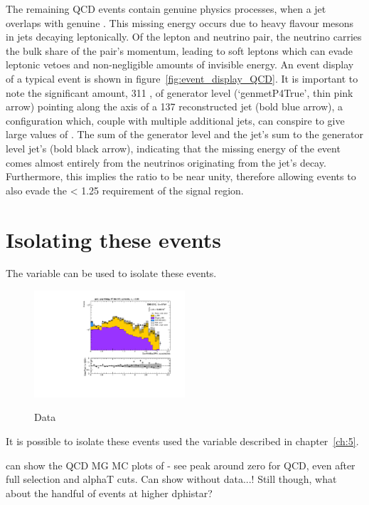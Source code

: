 The remaining QCD events contain genuine physics processes, when a jet overlaps
with genuine \met. This missing energy occurs due to heavy flavour mesons in
jets decaying leptonically. Of the lepton and neutrino pair, the neutrino
carries the bulk share of the pair's momentum, leading to soft leptons which
can evade leptonic vetoes and non-negligible amounts of invisible energy. An
event display of a typical event is shown in figure~\ref{fig:event_display_QCD}.
It is important to note the significant amount, 311 \gev, of generator level
\met (`genmetP4True', thin pink arrow) pointing along the axis of a 137
\gev \Pt reconstructed jet (bold blue arrow), a configuration which,
couple with multiple additional jets, can conspire to give
large values of \alphat. The sum of the generator level \met \Pt and
the jet's \Pt sum to the generator level jet's \Pt (bold black arrow),
indicating that the missing energy of the event comes almost entirely from the
neutrinos originating from the jet's decay. Furthermore, this implies the ratio
\mhtmet to be near unity, therefore allowing events to also evade the \mhtmet <
1.25 requirement of the signal region.

\section{Isolating these events}

The variable \mindphistar can be used to isolate these events.

\begin{figure}[h!]
\centering
\includegraphics[width=0.5\textwidth]{Figs/datapred/Prediction_ComMinBiasDPhi_acceptedJets_all_375_upwards_QCD.pdf}
\label{fig:data_pred_dphistar_qcd}
\caption{Data}
\end{figure}

It is possible to isolate these events used the \mindphistar variable described
in chapter~\ref{ch:5}. 

can show the QCD MG MC plots of \dphistar - see peak around zero for QCD, even
after full selection and alphaT cuts. Can show without data...! Still though,
what about the handful of events at higher dphistar?

